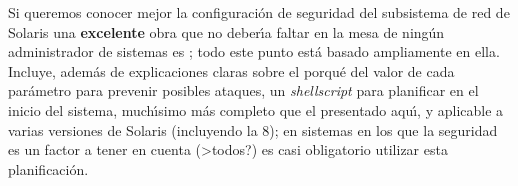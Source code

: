 Si queremos conocer mejor la configuraci\'on de seguridad del subsistema de
red de Solaris una {\bf excelente} obra que no deber\'{\i}a faltar en la mesa
de ning\'un administrador de sistemas es \cite{kn:noo99}; todo este punto est\'a
basado ampliamente en ella. Incluye, adem\'as de explicaciones claras sobre 
el porqu\'e del valor de cada par\'ametro para prevenir posibles ataques, un
{\it shellscript} para planificar en el inicio del sistema, much\'{\i}simo m\'as
completo que el presentado aqu\'{\i}, y aplicable a varias versiones de Solaris
(incluyendo la 8); en sistemas en los que la seguridad es un factor a tener en
cuenta (>todos?) es casi obligatorio utilizar esta planificaci\'on.
